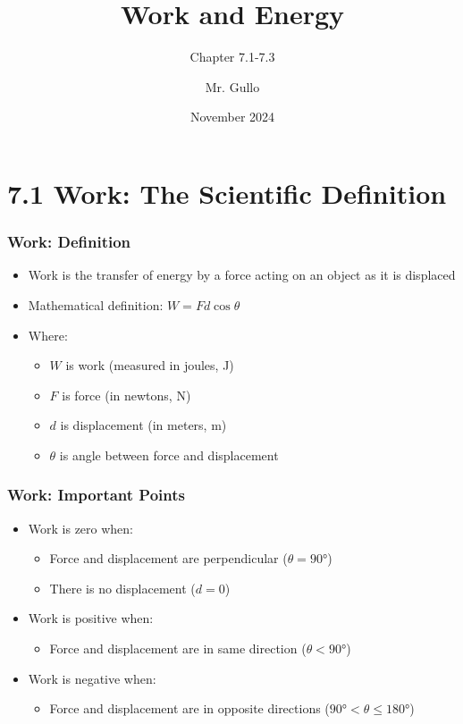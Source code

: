 \documentclass{beamer}
\title[PHYS12 CH7.1-7.3]{Work and Energy}
\subtitle{Chapter 7.1-7.3}
\author[Mr. Gullo]{Mr. Gullo}
\date[Nov 2024]{November 2024}
\begin{document}
\frame{\titlepage}

\section{7.1 Work: The Scientific Definition}

\begin{frame}
\frametitle{Work: Definition}
\begin{itemize}
    \item Work is the transfer of energy by a force acting on an object as it is displaced
    \item Mathematical definition: $W = F d \cos\theta$
    \item Where:
    \begin{itemize}
        \item $W$ is work (measured in joules, J)
        \item $F$ is force (in newtons, N)
        \item $d$ is displacement (in meters, m)
        \item $\theta$ is angle between force and displacement
    \end{itemize}
\end{itemize}
\end{frame}

\begin{frame}
\frametitle{Work: Important Points}
\begin{itemize}
    \item Work is zero when:
    \begin{itemize}
        \item Force and displacement are perpendicular ($\theta = 90°$)
        \item There is no displacement ($d = 0$)
    \end{itemize}
    \item Work is positive when:
    \begin{itemize}
        \item Force and displacement are in same direction ($\theta < 90°$)
    \end{itemize}
    \item Work is negative when:
    \begin{itemize}
        \item Force and displacement are in opposite directions ($90° < \theta \leq 180°$)
    \end{itemize}
\end{itemize}
\end{frame}
\end{document}
